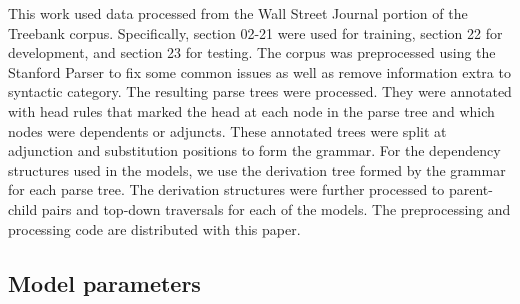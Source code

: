 \documentclass[11pt]{article}
\begin{document}
This work used data processed from the Wall Street Journal portion of the Treebank corpus. Specifically, section 02-21 were used for training, section 22 for development, and section 23 for testing.  The corpus was preprocessed using the Stanford Parser to fix some common issues as well as remove information extra to syntactic category.  The resulting parse trees were processed.  They were annotated with head rules that marked the head at each node in the parse tree and which nodes were dependents or adjuncts.  These annotated trees were split at adjunction and substitution positions to form the grammar.  For the dependency structures used in the models, we use the derivation tree formed by the grammar for each parse tree.  The derivation structures were further processed to parent-child pairs and top-down traversals for each of the models.  The preprocessing and processing code are distributed with this paper. 

\subsection{Model parameters}
\end{document}
